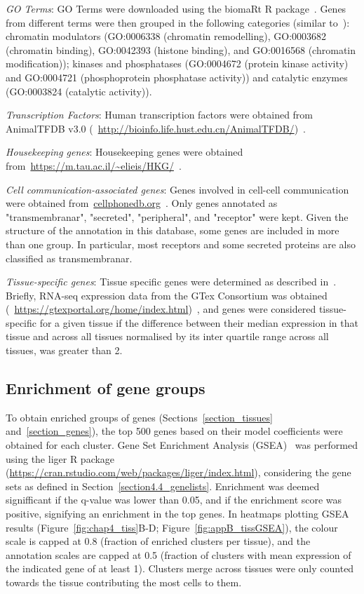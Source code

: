 \textit{GO Terms}: GO Terms were downloaded using the biomaRt R package~\citep{durinck_mapping_2009}. Genes from different terms were then grouped in the following categories (similar to~\citep{hagai_gene_2018}): chromatin modulators (GO:0006338 (chromatin remodelling), GO:0003682 (chromatin binding), GO:0042393 (histone binding), and GO:0016568 (chromatin modification)); kinases and phosphatases (GO:0004672 (protein kinase activity) and GO:0004721 (phosphoprotein phosphatase activity)) and catalytic enzymes (GO:0003824 (catalytic activity)).

\textit{Transcription Factors}: Human transcription factors were obtained from AnimalTFDB v3.0 (~\url{http://bioinfo.life.hust.edu.cn/AnimalTFDB/})~\citep{hu_animaltfdb_2019}.

\textit{Housekeeping genes}: Housekeeping genes were obtained from~\url{https://m.tau.ac.il/~elieis/HKG/}~\citep{eisenberg_human_2013}.

\textit{Cell communication-associated genes}: Genes involved in cell-cell communication were obtained from~\url{cellphonedb.org}~\citep{efremova_cellphonedb_2019}. Only genes annotated as "transmembranar", "secreted", "peripheral", and "receptor" were kept. Given the structure of the annotation in this database, some genes are included in more than one group. In particular, most receptors and some secreted proteins are also classified as transmembranar.

\textit{Tissue-specific genes}: Tissue specific genes were determined as described in~\citep{sonawane_understanding_2017}. Briefly, RNA-seq expression data from the GTex Consortium was obtained (~\url{https://gtexportal.org/home/index.html})~\citep{consortium_genotype-tissue_2015}, and genes were considered tissue-specific for a given tissue if the difference between their median expression in that tissue and across all tissues normalised by its inter quartile range across all tissues, was greater than 2.


\subsection{Enrichment of gene groups}
\label{section4.4_enr}
To obtain enriched groups of genes (Sections~\ref{section_tissues} and~\ref{section_genes}), the top 500 genes based on their model coefficients were obtained for each cluster. Gene Set Enrichment Analysis (GSEA)~\citep{subramanian_gene_2005} was performed using the liger R package (\url{https://cran.rstudio.com/web/packages/liger/index.html}), considering the gene sets as defined in Section~\ref{section4.4_genelists}. Enrichment was deemed signifficant if the q-value was lower than 0.05, and if the enrichment score was positive, signifying an enrichment in the top genes. In heatmaps plotting GSEA results (Figure~\ref{fig:chap4_tiss}B-D; Figure~\ref{fig:appB_tissGSEA}), the colour scale is capped at 0.8 (fraction of enriched clusters per tissue), and the annotation scales are capped at 0.5 (fraction of clusters with mean expression of the indicated gene of at least 1). Clusters merge across tissues were only counted towards the tissue contributing the most cells to them.


